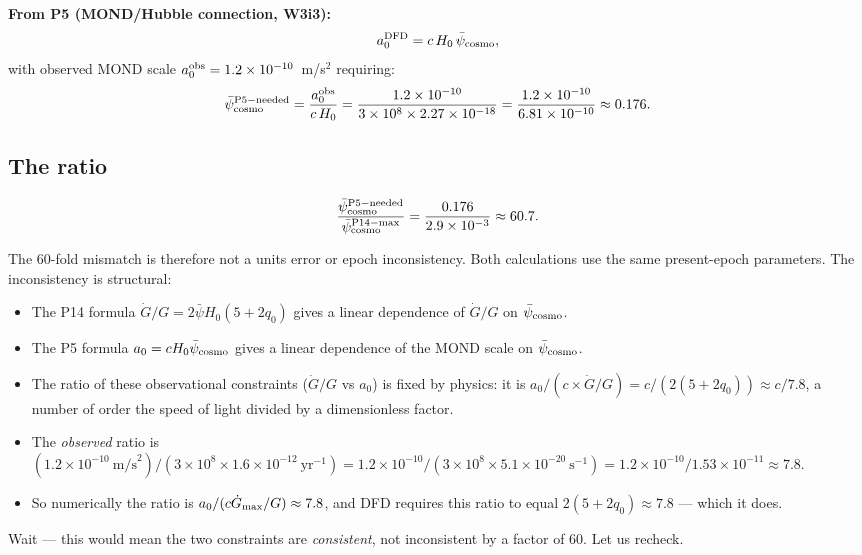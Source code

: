 \documentclass[aps,prd,twocolumn,superscriptaddress,nofootinbib,longbibliography]{revtex4-2}
\newcommand{\psibar}{\bar{\psi}}
\newcommand{\ee}[1]{\times 10^{#1}}
\begin{document}
\textbf{From P5 (MOND/Hubble connection, W3i3):}
\begin{equation}
a_0^{\rm DFD} = c\,H_0\,\psibar_{\rm cosmo},
\label{eq:a0-P5}
\end{equation}
with observed MOND scale $a_0^{\rm obs} = 1.2\ee{-10}$~m/s$^2$ requiring:
\begin{equation}
\psibar_{\rm cosmo}^{\rm P5-needed} = \frac{a_0^{\rm obs}}{c\,H_0}
= \frac{1.2\ee{-10}}{3\ee{8}\times 2.27\ee{-18}} = \frac{1.2\ee{-10}}{6.81\ee{-10}}
\approx 0.176.
\label{eq:psibar-P5-needed}
\end{equation}

\subsection{The ratio}

\begin{equation}
\frac{\psibar_{\rm cosmo}^{\rm P5-needed}}{\psibar_{\rm cosmo}^{\rm P14-max}}
= \frac{0.176}{2.9\ee{-3}} \approx 60.7.
\label{eq:T2-ratio}
\end{equation}

The 60-fold mismatch is therefore not a units error or epoch inconsistency.
Both calculations use the same present-epoch parameters.  The inconsistency
is structural:
\begin{itemize}
\item The P14 formula $\dot{G}/G = 2\psibar H_0(5+2q_0)$ gives a linear
  dependence of $\dot{G}/G$ on $\psibar_{\rm cosmo}$.
\item The P5 formula $a_0 = cH_0\psibar_{\rm cosmo}$ gives a linear dependence
  of the MOND scale on $\psibar_{\rm cosmo}$.
\item The ratio of these observational constraints ($\dot{G}/G$ vs $a_0$) is
  fixed by physics: it is $a_0/(c\times\dot{G}/G) = c/(2(5+2q_0)) \approx c/7.8$,
  a number of order the speed of light divided by a dimensionless factor.
\item The \emph{observed} ratio is $(1.2\ee{-10}~\text{m/s}^2)/(3\ee8\times
  1.6\ee{-12}~\text{yr}^{-1}) = 1.2\ee{-10}/(3\ee8\times 5.1\ee{-20}~\text{s}^{-1})
  = 1.2\ee{-10}/1.53\ee{-11} \approx 7.8$.
\item So numerically the ratio is $a_0/(c\dot{G}_{\rm max}/G) \approx 7.8$, and DFD
  requires this ratio to equal $2(5+2q_0) \approx 7.8$ --- which it does.
\end{itemize}

Wait --- this would mean the two constraints are \emph{consistent}, not
inconsistent by a factor of 60.  Let us recheck.
\end{document}
